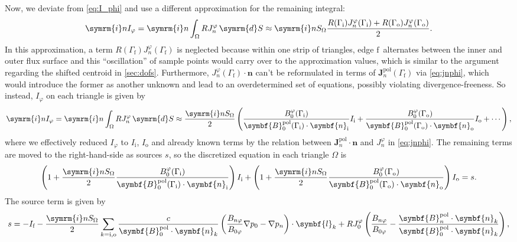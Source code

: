\documentclass[a4paper, twoside, 10pt, english]{article}
\numberwithin{equation}{section}
\let\temp\varrho
\let\varrho\rho
\let\rho\temp
\let\temp\vartheta
\let\vartheta\theta
\let\theta\temp
\let\temp\varphi
\let\varphi\phi
\let\phi\temp
\let\vec\symbf
\newcommand*\grad{\ensuremath{\nabla}}
\newcommand*\diff{\ensuremath{\symrm{d}}}  %
\newcommand*\im{\ensuremath{\symrm{i}}}  %
\newcommand*\pol{\ensuremath{\textrm{pol}}}  %
\newcommand*\fs{\ensuremath{\textrm{f}}}  %
\newcommand*\inw{\ensuremath{\textrm{i}}}  %
\newcommand*\out{\ensuremath{\textrm{o}}}  %
\begin{document}
Now, we deviate from \cref{eq:I_phi} and use a different approximation for the remaining integral:
\begin{gather}
  \im n I_{\phi} = \im n \int_{\Omega} R J_{n}^{\phi} \, \diff S \approx \im n S_{\Omega} \frac{R (\Gamma_{\inw}) J_{n}^{\phi} (\Gamma_{\inw}) + R (\Gamma_{\out}) J_{n}^{\phi} (\Gamma_{\out})}{2}.
\end{gather}
In this approximation, a term $R (\Gamma_{\fs}) J_{n}^{\phi} (\Gamma_{\fs})$ is neglected because within one strip of triangles, edge \fs\ alternates between the inner and outer flux surface and this \enquote{oscillation} of sample points would carry over to the approximation values, which is similar to the argument regarding the shifted centroid in \cref{sec:dofs}. Furthermore, $J_{n}^{\phi} (\Gamma_{\fs}) \cdot \vec{n}$ can't be reformulated in terms of $\vec{J}_{n}^{\pol} (\Gamma_{\fs})$ via \cref{eq:jnphi}, which would introduce the former as another unknown and lead to an overdetermined set of equations, possibly violating divergence-freeness. So instead, $I_{\phi}$ on each triangle is given by
\begin{gather}
  \im n I_{\phi} = \im n \int_{\Omega} R J_{n}^{\phi} \, \diff S \approx \frac{\im n S_{\Omega}}{2} \left ( \frac{B_{0}^{\phi} (\Gamma_{\inw})}{\vec{B}_{0}^{\pol} (\Gamma_{\inw}) \cdot \vec{n}_{\inw}} I_{\inw} + \frac{B_{0}^{\phi} (\Gamma_{\out})}{\vec{B}_{0}^{\pol} (\Gamma_{\out}) \cdot \vec{n}_{\out}} I_{\out} + \dotsb \right ),
\end{gather}
where we effectively reduced $I_{\phi}$ to $I_{\inw}$, $I_{\out}$ and already known terms by the relation between $\vec{J}_{n}^{\pol} \cdot \vec{n}$ and $J_{n}^{\phi}$ in \cref{eq:jnphi}. The remaining terms are moved to the right-hand-side as sources $s$, so the discretized equation in each triangle $\Omega$ is
\begin{gather}
  \left ( 1 + \frac{\im n S_{\Omega}}{2} \frac{B_{0}^{\phi} (\Gamma_{\inw})}{\vec{B}_{0}^{\pol} (\Gamma_{\inw}) \cdot \vec{n}_{\inw}} \right ) I_{\inw} + \left ( 1 + \frac{\im n S_{\Omega}}{2} \frac{B_{0}^{\phi} (\Gamma_{\out})}{\vec{B}_{0}^{\pol} (\Gamma_{\out}) \cdot \vec{n}_{\out}} \right ) I_{\out} = s. \label{eq:Ii-Io}
\end{gather}
The source term is given by
\begin{gather}
  s = -I_{\fs} - \frac{\im n S_{\Omega}}{2} \sum_{k = \inw, \out} \frac{c}{\vec{B}_{0}^{\pol} \cdot \vec{n}_{k}} \left ( \frac{B_{n \phi}}{B_{0 \phi}} \grad p_{0} - \grad p_{n} \right ) \cdot \vec{l}_{k} + R J_{0}^{\phi} \left ( \frac{B_{n \phi}}{B_{0 \phi}} - \frac{\vec{B}_{n}^{\pol} \cdot \vec{n}_{k}}{\vec{B}_{0}^{\pol} \cdot \vec{n}_{k}} \right ),
\end{gather}
\end{document}
